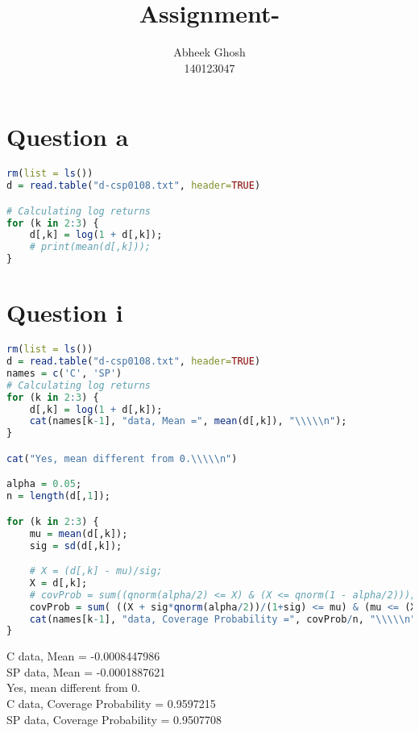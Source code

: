 \documentclass{article}
\begin{document}
	\title{\textbf{Assignment-}}
	\author{Abheek Ghosh \\ 
		140123047 }
	
	\maketitle
	

\section{Question a}


\begin{lstlisting}[language=R]
rm(list = ls())
d = read.table("d-csp0108.txt", header=TRUE)

# Calculating log returns
for (k in 2:3) {
	d[,k] = log(1 + d[,k]);
	# print(mean(d[,k]));
}
\end{lstlisting}

\pagebreak


\section{Question i}


\begin{lstlisting}[language=R]
rm(list = ls())
d = read.table("d-csp0108.txt", header=TRUE)
names = c('C', 'SP')
# Calculating log returns
for (k in 2:3) {
	d[,k] = log(1 + d[,k]);
	cat(names[k-1], "data, Mean =", mean(d[,k]), "\\\\\n");
}

cat("Yes, mean different from 0.\\\\\n")

alpha = 0.05;
n = length(d[,1]);

for (k in 2:3) {
	mu = mean(d[,k]);
	sig = sd(d[,k]);

	# X = (d[,k] - mu)/sig;
	X = d[,k];
	# covProb = sum((qnorm(alpha/2) <= X) & (X <= qnorm(1 - alpha/2)));
	covProb = sum( ((X + sig*qnorm(alpha/2))/(1+sig) <= mu) & (mu <= (X + sig*qnorm(1 - alpha/2))/(1+sig)) );
	cat(names[k-1], "data, Coverage Probability =", covProb/n, "\\\\\n")
}
\end{lstlisting}

C data, Mean = -0.0008447986 \\
SP data, Mean = -0.0001887621 \\
Yes, mean different from 0.\\
C data, Coverage Probability = 0.9597215 \\
SP data, Coverage Probability = 0.9507708 \\
\end{document}
